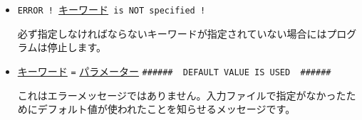 \begin{itemize}
\item \verb|ERROR ! |\underline{キーワード}\verb| is NOT specified !|

必ず指定しなければならないキーワードが指定されていない場合にはプログラムは停止します。

\item \underline{キーワード} \verb|=| \underline{パラメーター} \verb|######  DEFAULT VALUE IS USED  ######|

これはエラーメッセージではありません。入力ファイルで指定がなかったためにデフォルト値が使われたことを知らせるメッセージです。

\end{itemize}

 
 
